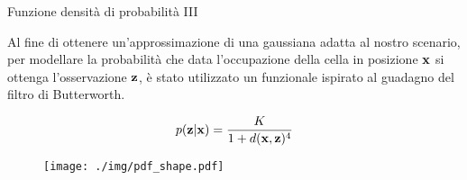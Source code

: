 \documentclass[10pt]{beamer}
\begin{document}
	\begin{frame}{Funzione densità di probabilità III}

	Al fine di ottenere un'approssimazione di una gaussiana adatta al
	nostro scenario, per modellare la probabilità che data l'occupazione della
	cella in posizione $ {\bf x} $ si ottenga l'osservazione $ {\bf z} $, è
	stato utilizzato un funzionale ispirato al guadagno del filtro di
	Butterworth.

	\begin{equation}\label{eq:pdf}
	p({\bf z}|{\bf x}) = \frac	{K}
	{1 + d({\bf x},{\bf z})^4 } 
	\end{equation}
	
	\begin{figure}[ht]
		\centering
		\texttt{[image: ./img/pdf\_shape.pdf]}
		\label{fig:pdf_shape}
	\end{figure}
	
	
	\end{frame}
\end{document}
